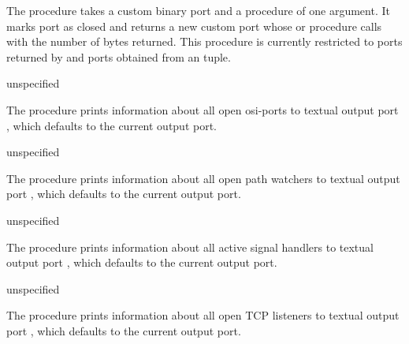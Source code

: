 The  procedure takes a custom binary port  and a
 procedure of one argument.
It marks port  as closed and returns a new custom port whose  or
 procedure calls  with the number of bytes returned.
This procedure is currently restricted to ports returned by 
and ports obtained from an  tuple.

\begin{procedure}
\end{procedure}
\returns{} unspecified

The  procedure prints information about all open
osi-ports to textual output port , which defaults to the
current output port.

\begin{procedure}
\end{procedure}
\returns{} unspecified

The  procedure prints information about all
open path watchers to textual output port
, which defaults to the current output port.

\begin{procedure}
\end{procedure}
\returns{} unspecified

The  procedure prints information about all
active signal handlers to textual output port
, which defaults to the current output port.

\begin{procedure}
\end{procedure}
\returns{} unspecified

The  procedure prints information about all
open TCP listeners to textual output port
, which defaults to the current output port.

